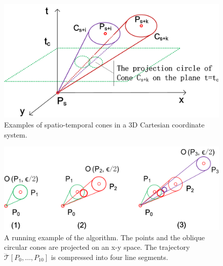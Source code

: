 	
\begin{figure}[tb!]
	\centering
	\includegraphics[scale=0.66]{figures/Fig-CIS.png}
	\vspace{-1ex}
	\caption{\small Examples of spatio-temporal cones in a 3D Cartesian coordinate system.}
	\vspace{-1ex}
	\label{fig:cis}
\end{figure}


\begin{figure}[tb!]
	\centering
	\includegraphics[scale=0.66]{figures/Fig-Conest.png}
	\vspace{-2ex}
	\caption{\small A running example of the \cised algorithm. The points and the oblique circular cones are projected on an x-y space. The trajectory $\dddot{\mathcal{T}}[P_0, \ldots, P_{10}]$ is compressed into four line segments.}
	\vspace{-1ex}
	\label{fig:exm-const}
\end{figure}


